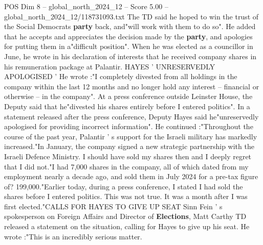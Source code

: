 \begin{textsample}{POS Dim 8 – global\_north\_2024\_12 – Score 5.00 – global\_north\_2024\_12/118731093.txt}  \label{ex:f8_pos_347}
The TD said he hoped to win the trust of the Social Democrats \textbf{party} back, and"will work with them to do so".
He added that he accepts and appreciates the decision made by the \textbf{party}, and apologies for putting them in a"difficult position".
When he was elected as a councillor in June, he wrote in his declaration of interests that he received company shares in his remuneration package at Palantir.
HAYES ' UNRESERVEDLY APOLOGISED ' He wrote :"I completely divested from all holdings in the company within the last 12 months and no longer hold any interest -- financial or otherwise -- in the company".
At a press conference outside Leinster House, the Deputy said that he"divested his shares entirely before I entered politics".
In a statement released after the press conference, Deputy Hayes said he"unreservedly apologised for providing incorrect information".
He continued :"Throughout the course of the past year, Palantir ' s support for the Israeli military has markedly increased."In January, the company signed a new strategic partnership with the Israeli Defence Ministry.
I should have sold my shares then and I deeply regret that I did not."I had 7,000 shares in the company, all of which dated from my employment nearly a decade ago, and sold them in July 2024 for a pre-tax figure of? 199,000."Earlier today, during a press conference, I stated I had sold the shares before I entered politics.
This was not true.
It was a month after I was first elected."CALLS FOR HAYES TO GIVE UP SEAT Sinn Fein ' s spokesperson on Foreign Affairs and Director of \textbf{Elections}, Matt Carthy TD released a statement on the situation, calling for Hayes to give up his seat.
He wrote :"This is an incredibly serious matter.

\end{textsample}
